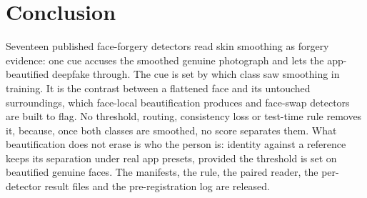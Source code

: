 \documentclass[conference]{IEEEtran}
\begin{document}
\section{Conclusion}
Seventeen published face-forgery detectors read skin smoothing as forgery evidence: one cue accuses the smoothed genuine
photograph and lets the app-beautified deepfake through. The cue is set by which class saw smoothing in training. It is the
contrast between a flattened face and its untouched surroundings, which face-local beautification produces and face-swap
detectors are built to flag. No threshold, routing, consistency loss or test-time rule removes it, because, once both
classes are smoothed, no score separates them.
What beautification does not erase is who the person is: identity against a reference keeps its separation under real app
presets, provided the threshold is set on beautified genuine faces. The manifests, the rule, the paired reader, the per-detector result files and the pre-registration log are released.



\end{document}
